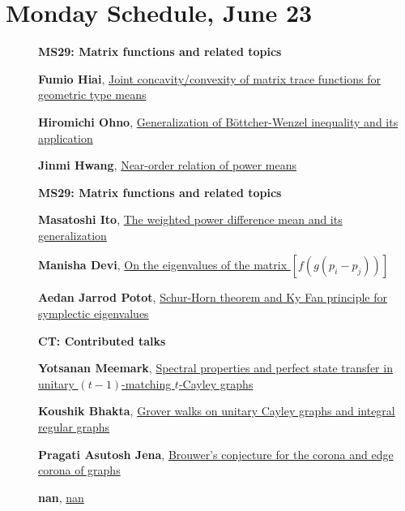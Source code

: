 \documentclass[ILAS2025-program.tex]{subfiles}
\begin{document}
\section*{Monday Schedule, June 23 }
        
        \begin{description}
    \item[] {\color{mstitle}\textbf{MS29: Matrix functions and related topics}} 
    \item[] \hypertarget{up0013}{}\textbf{Fumio Hiai}, \hyperlink{down0013}{Joint concavity/convexity of matrix trace functions for geometric type means}
        \item[] \hypertarget{up0014}{}\textbf{Hiromichi Ohno}, \hyperlink{down0014}{Generalization of B\"ottcher-Wenzel inequality and its application}
        \item[] \hypertarget{up0015}{}\textbf{Jinmi Hwang}, \hyperlink{down0015}{Near-order relation of power means}
        \end{description}
    \begin{description}
    \item[] {\color{mstitle}\textbf{MS29: Matrix functions and related topics}} 
    \item[] \hypertarget{up0046}{}\textbf{Masatoshi Ito}, \hyperlink{down0046}{The weighted power difference mean and its generalization}
        \item[] \hypertarget{up0047}{}\textbf{Manisha Devi}, \hyperlink{down0047}{On the eigenvalues of the matrix $[f(g(p_i-p_j))]$}
        \item[] \hypertarget{up0048}{}\textbf{Aedan Jarrod Potot}, \hyperlink{down0048}{Schur-Horn theorem and Ky Fan principle for symplectic eigenvalues
}
        \end{description}
    \begin{description}
    \item[] {\color{mstitle}\textbf{CT: Contributed talks}} 
    \item[] \hypertarget{up0080}{}\textbf{Yotsanan Meemark}, \hyperlink{down0080}{Spectral properties and perfect state transfer in unitary $(t-1)$-matching $t$-Cayley graphs}
        \item[] \hypertarget{up0081}{}\textbf{Koushik Bhakta}, \hyperlink{down0081}{Grover walks on unitary Cayley graphs and integral regular graphs}
        \item[] \hypertarget{up0082}{}\textbf{Pragati Asutosh Jena}, \hyperlink{down0082}{Brouwer's conjecture for the corona and edge corona of graphs}
        \item[] \hypertarget{up0083}{}\textbf{nan}, \hyperlink{down0083}{nan}
        \end{description}
    \newpage
\end{document}
